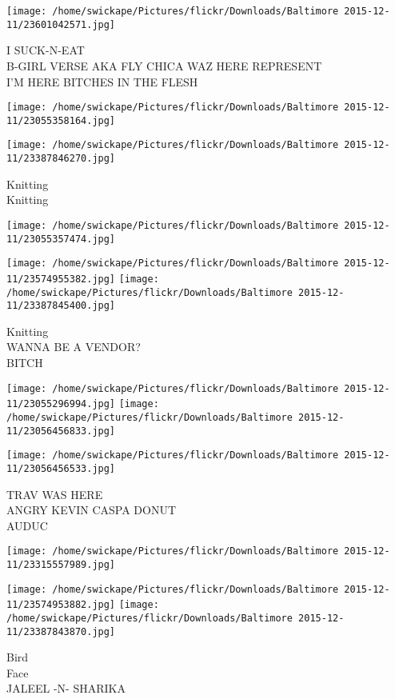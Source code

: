 \documentclass[10pt,letterpaper]{article}
\begin{document}
\texttt{[image: /home/swickape/Pictures/flickr/Downloads/Baltimore 2015-12-11/23601042571.jpg]}

I SUCK{-}N{-}EAT\\
B{-}GIRL VERSE AKA FLY CHICA WAZ HERE REPRESENT\\
I'M HERE BITCHES IN THE FLESH
\pagebreak

\texttt{[image: /home/swickape/Pictures/flickr/Downloads/Baltimore 2015-12-11/23055358164.jpg]}

\vspace{0.25in}
\texttt{[image: /home/swickape/Pictures/flickr/Downloads/Baltimore 2015-12-11/23387846270.jpg]}

Knitting\\
Knitting
\pagebreak

\texttt{[image: /home/swickape/Pictures/flickr/Downloads/Baltimore 2015-12-11/23055357474.jpg]}

\vspace{0.25in}
\texttt{[image: /home/swickape/Pictures/flickr/Downloads/Baltimore 2015-12-11/23574955382.jpg]}
\texttt{[image: /home/swickape/Pictures/flickr/Downloads/Baltimore 2015-12-11/23387845400.jpg]}

Knitting\\
WANNA BE A VENDOR?\\
BITCH
\pagebreak

\texttt{[image: /home/swickape/Pictures/flickr/Downloads/Baltimore 2015-12-11/23055296994.jpg]}
\texttt{[image: /home/swickape/Pictures/flickr/Downloads/Baltimore 2015-12-11/23056456833.jpg]}

\texttt{[image: /home/swickape/Pictures/flickr/Downloads/Baltimore 2015-12-11/23056456533.jpg]}

TRAV WAS HERE\\
ANGRY KEVIN CASPA DONUT\\
AUDUC
\pagebreak

\texttt{[image: /home/swickape/Pictures/flickr/Downloads/Baltimore 2015-12-11/23315557989.jpg]}

\vspace{0.25in}
\texttt{[image: /home/swickape/Pictures/flickr/Downloads/Baltimore 2015-12-11/23574953882.jpg]}
\texttt{[image: /home/swickape/Pictures/flickr/Downloads/Baltimore 2015-12-11/23387843870.jpg]}

Bird\\
Face\\
JALEEL {-}N{-} SHARIKA
\pagebreak
\end{document}
